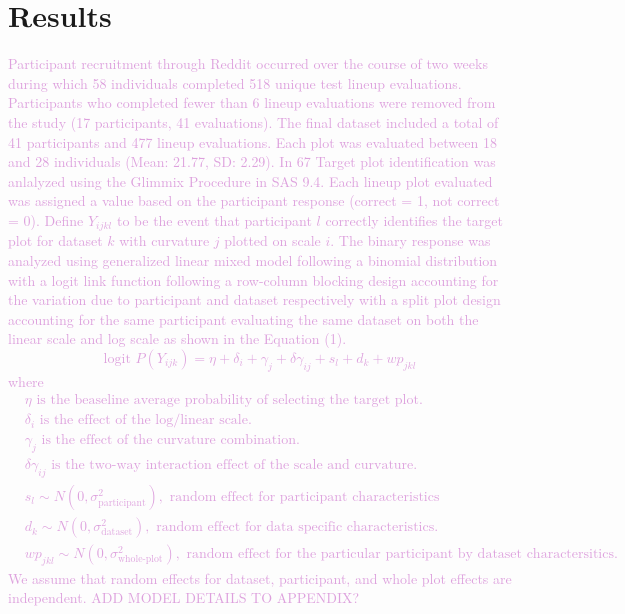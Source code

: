 \documentclass[]{interact}
\theoremstyle{plain}%
\theoremstyle{definition}
\theoremstyle{remark}
\begin{document}
\hypertarget{results}{%
\section{Results}\label{results}}

\textcolor{Plum}{
Participant recruitment through Reddit occurred over the course of two weeks during which 58 individuals completed 518 unique test lineup evaluations. Participants who completed fewer than 6 lineup evaluations were removed from the study (17 participants, 41 evaluations). The final dataset included a total of 41 participants and 477 lineup evaluations. Each plot was evaluated between 18 and 28 individuals (Mean: 21.77, SD: 2.29). In 67%
}
\textcolor{Plum}{
Target plot identification was anlalyzed using the Glimmix Procedure in SAS 9.4. Each lineup plot evaluated was assigned a value based on the participant response (correct = 1, not correct = 0). Define $Y_{ijkl}$ to be the event that participant $l$ correctly identifies the target plot for dataset $k$ with curvature $j$ plotted on scale $i$. The binary response was analyzed using generalized linear mixed model following a binomial distribution with a logit link function following a row-column blocking design accounting for the variation due to participant and dataset respectively with a split plot design accounting for the same participant evaluating the same dataset on both the linear scale and log scale as shown in the Equation (1).
\begin{equation}
\text{logit }P(Y_{ijk}) = \eta + \delta_i + \gamma_j + \delta \gamma_{ij} + s_l + d_k + wp_{jkl}
\end{equation}
where
\begin{align*}
&\eta               \text{ is the beaseline average probability of selecting the target plot.} \\
&\delta_i           \text{ is the effect of the log/linear scale.} \\
&\gamma_j           \text{ is the effect of the curvature combination.} \\
&\delta\gamma_{ij}  \text{ is the two-way interaction effect of the scale and curvature.} \\
&s_l \sim N(0,\sigma^2_\text{{participant}}), \text{ random effect for participant characteristics} \\
&d_k \sim N(0,\sigma^2_{\text{dataset}}), \text{ random effect for data specific characteristics.} \\
&wp_{jkl} \sim N(0,\sigma^2_\text{{whole-plot}}), \text{ random effect for the particular participant by dataset charactersitics.}
\end{align*}
We assume that random effects for dataset, participant, and whole plot effects are independent. ADD MODEL DETAILS TO APPENDIX?
}
\end{document}
